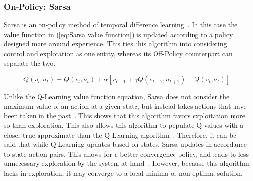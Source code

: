 \documentclass[12pt,american]{report}
\begin{document}
        \subsubsection{On-Policy: Sarsa}
        Sarsa is an on-policy method of temporal difference learning~\cite{sprague2003multiple}. In this case the value function in (\ref{eq:Sarsa value function}) is updated according to a policy designed more around experience.  This ties this algorithm into considering control and exploration as one entity, whereas its Off-Policy counterpart can separate the two.

        \begin{equation}
            \label{eq:Sarsa value function}
            Q(s_{t},a_{t}) = Q(s_{t},a_{t}) + \alpha[r_{t+1} + \gamma Q(s_{t+1},a_{t+1})-Q(s_{t},a_{t})]
        \end{equation}

        Unlike the Q-Learning value function equation, Sarsa does not consider the maximum value of an action at a given state, but instead takes actions that have been taken in the past~\cite{Eden}. This shows that this algorithm favors exploitation more so than exploration. This also allows this algorithm to populate Q-values with a closer true approximate than the Q-Learning algorithm~\cite{sprague2003multiple}. Therefore, it can be said that while Q-Learning updates based on states, Sarsa updates in accordance to state-action pairs.  This allows for a better convergence policy, and leads to less unnecessary exploration by the system at hand~\cite{sutton1996generalization}.  However, because this algorithm lacks in exploration, it may converge to a local minima or non-optimal solution.
\end{document}

